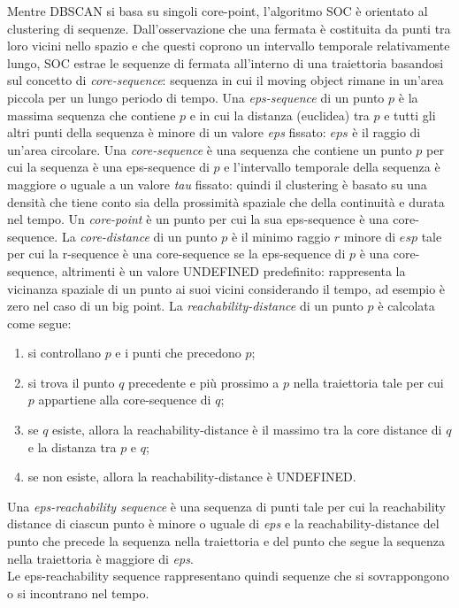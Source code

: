 \documentclass[12pt]{article}
\begin{document}
Mentre DBSCAN si basa su singoli core-point, l'algoritmo SOC è orientato al clustering di sequenze.
Dall'osservazione che una fermata è costituita da punti tra loro vicini nello spazio e che questi coprono un intervallo temporale relativamente lungo, SOC estrae le sequenze di fermata all'interno di una traiettoria basandosi sul concetto di \emph{core-sequence}: sequenza in cui il moving object rimane in un'area piccola per un lungo periodo di tempo.
Una \emph{eps-sequence} di un punto $p$ è la massima sequenza che contiene $p$ e in cui la distanza (euclidea) tra $p$ e tutti gli altri punti della sequenza è minore di un valore \emph{eps} fissato: $eps$ è il raggio di un'area circolare.
Una \emph{core-sequence} è una sequenza che contiene un punto $p$ per cui la sequenza è una eps-sequence di $p$ e l'intervallo temporale della sequenza è maggiore o uguale a un valore \emph{tau} fissato: quindi il clustering è basato su una densità che tiene conto sia della prossimità spaziale che della continuità e durata nel tempo.
Un \emph{core-point} è un punto per cui la sua eps-sequence è una core-sequence.
La \emph{core-distance} di un punto $p$ è il minimo raggio $r$ minore di $esp$ tale per cui la r-sequence è una core-sequence se la eps-sequence di $p$ è una core-sequence, altrimenti è un valore UNDEFINED predefinito: rappresenta la vicinanza spaziale di un punto ai suoi vicini considerando il tempo, ad esempio è zero nel caso di un big point.
La \emph{reachability-distance} di un punto $p$ è calcolata come segue:
\begin{enumerate}
    \item si controllano $p$ e i punti che precedono $p$;
    \item si trova il punto $q$ precedente e più prossimo a $p$ nella traiettoria tale per cui $p$ appartiene alla core-sequence di $q$;
    \item se $q$ esiste, allora la reachability-distance è il massimo tra la core distance di $q$ e la distanza tra $p$ e $q$;
    \item se non esiste, allora la reachability-distance è UNDEFINED.
\end{enumerate}
Una \emph{eps-reachability sequence} è una sequenza di punti tale per cui la reachability distance di ciascun punto è minore o uguale di \emph{eps} e la reachability-distance del punto che precede la sequenza nella traiettoria e del punto che segue la sequenza nella traiettoria è maggiore di \emph{eps}.\\
Le eps-reachability sequence rappresentano quindi sequenze che si sovrappongono o si incontrano nel tempo.
\end{document}
